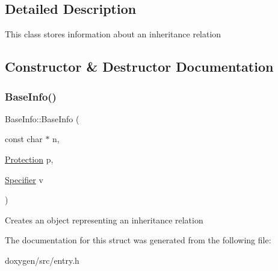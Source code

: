 \subsection{Detailed Description}
This class stores information about an inheritance relation 

\subsection{Constructor \& Destructor Documentation}
\mbox{\label{struct_base_info_a98a84177d9d88a0520f7db57a13d2a4d}} 
\subsubsection{\texorpdfstring{BaseInfo()}{BaseInfo()}}
{\footnotesize\ttfamily Base\+Info\+::\+Base\+Info (\begin{DoxyParamCaption}\item[{const char $\ast$}]{n,  }\item[{\mbox{\hyperlink{types_8h_a90e352184df58cd09455fe9996cd4ded}{Protection}}}]{p,  }\item[{\mbox{\hyperlink{types_8h_ab16236bdd10ddf4d73a9847350f0017e}{Specifier}}}]{v }\end{DoxyParamCaption})\hspace{0.3cm}{\ttfamily [inline]}}

Creates an object representing an inheritance relation 

The documentation for this struct was generated from the following file\+:\begin{DoxyCompactItemize}
\item 
doxygen/src/entry.\+h\end{DoxyCompactItemize}

